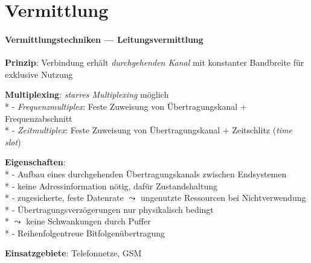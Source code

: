 \section{Vermittlung}

\paragraph{Vermittlungstechniken --- Leitungsvermittlung}
\begin{items}
  \item \textbf{Prinzip}: Verbindung erhält \emph{durchgehenden Kanal} mit konstanter Bandbreite für exklusive Nutzung
  \item \textbf{Multiplexing}: \emph{starres Multiplexing} möglich \\*
    - \emph{Frequenzmultiplex}: Feste Zuweisung von Übertragungskanal + Frequenzabschnitt \\*
    - \emph{Zeitmultiplex}: Feste Zuweisung von Übertragungskanal + Zeitschlitz (\emph{time slot})
  \item \textbf{Eigenschaften}: \\*
    - Aufbau eines durchgehenden Übertragungskanals zwischen Endsystemen \\*
    - keine Adressinformation nötig, dafür Zustandshaltung \\*
    - zugesicherte, feste Datenrate \( \leadsto \) ungenutzte Ressourcen bei Nichtverwendung \\*
    - Übertragungsverzögerungen nur physikalisch bedingt \\* \phantom{-} \phantom{-} \( \leadsto \) keine Schwankungen durch Puffer \\*
    - Reihenfolgentreue Bitfolgenübertragung
  \item \textbf{Einsatzgebiete}: Telefonnetze, GSM
\end{items}

